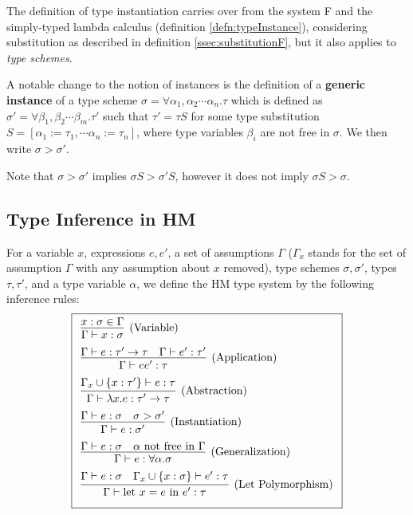 The definition of type instantiation carries over from the system F and the simply-typed lambda calculus (definition \ref{defn:typeInstance}), considering substitution as described in definition \ref{ssec:substitutionF}, but it also applies to \emph{type schemes}.

\begin{defn}
    A notable change to the notion of instances is the definition of a \textbf{generic instance} of a type scheme $\sigma = \forall \alpha_1, \alpha_2 \cdots \alpha_n . \tau$ which is defined as $\sigma' = \forall \beta_1, \beta_2 \cdots \beta_m . \tau'$ such that $\tau' = \tau S$ for some type substitution $S = [\alpha_1 := \tau_1, \cdots \alpha_n := \tau_n]$, where type variables $\beta_i$ are not free in $\sigma$. We then write $\sigma > \sigma'$. \cite{damas1982principal}
\end{defn}

Note that $\sigma > \sigma'$ implies $\sigma S > \sigma' S$, however it does not imply $\sigma S > \sigma$.

\subsection{Type Inference in HM}

\begin{defn}
    For a variable $x$, expressions $e, e'$, a set of assumptions $\Gamma$ ($\Gamma_x$ stands for the set of assumption $\Gamma$ with any assumption about $x$ removed), type schemes $\sigma, \sigma'$, types $\tau, \tau'$, and a type variable $\alpha$, we define the HM type system by the following inference rules:
    $$\boxed{\renewcommand{\arraystretch}{2.2}\begin{array}{l c}
        \infer[\text{(Variable)}]{\Gamma \vdash x : \sigma}{x : \sigma \in \Gamma} \\
        \infer[\text{(Application)}]{\Gamma \vdash e e' : \tau}{\Gamma \vdash e : \tau' \rightarrow \tau \quad \Gamma \vdash e' : \tau'} \\
        \infer[\text{(Abstraction)}]{\Gamma \vdash \lambda x . e : \tau' \rightarrow \tau}{\Gamma_x \cup \{x : \tau'\} \vdash e : \tau} \\
        \infer[\text{(Instantiation)}]{\Gamma \vdash e : \sigma'}{\Gamma \vdash e : \sigma & \sigma > \sigma'} \\
        \infer[\text{(Generalization)}]{\Gamma \vdash e : \forall \alpha . \sigma}{\Gamma \vdash e : \sigma & \alpha \text{ not free in }\Gamma} \\
        \infer[\text{(Let Polymorphism)}]{\Gamma \vdash \text{let } x = e \text{ in } e' : \tau}{\Gamma \vdash e : \sigma \quad \Gamma_x \cup \{x :\sigma\} \vdash e' : \tau}
    \end{array}}$$
\end{defn}

